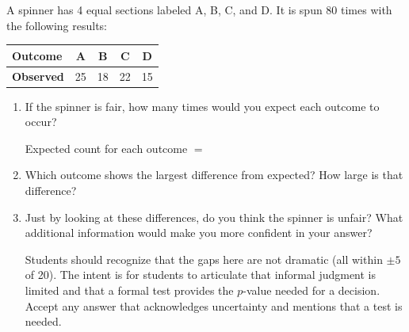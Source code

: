 \documentclass[10pt]{article}
\begin{document}
\namedateperiod

\vspace{0.1in}
A spinner has 4 equal sections labeled A, B, C, and D. It is spun 80 times with the
following results:

\vspace{0.08in}
\renewcommand{\arraystretch}{1.3}
\begin{tabularx}{0.6\linewidth}{Xcccc}
    \textbf{Outcome} & A & B & C & D \\
    \hline
    \textbf{Observed} & 25 & 18 & 22 & 15 \\
\end{tabularx}

\vspace{0.15in}

\begin{enumerate}

  \item If the spinner is fair, how many times would you expect each outcome to occur?

        \vspace{0.05in}
        Expected count for each outcome $= $ 

        \vspace{0.1in}

  \item Which outcome shows the largest difference from expected? How large is that
        difference?


  \item Just by looking at these differences, do you think the spinner is unfair?
        What additional information would make you more confident in your answer?


        \begin{teachernote}
            Students should recognize that the gaps here are not dramatic
            (all within $\pm 5$ of 20). The intent is for students to articulate
            that informal judgment is limited and that a formal test provides the
            $p$-value needed for a decision. Accept any answer that acknowledges
            uncertainty and mentions that a test is needed.
        \end{teachernote}

\end{enumerate}
\end{document}
